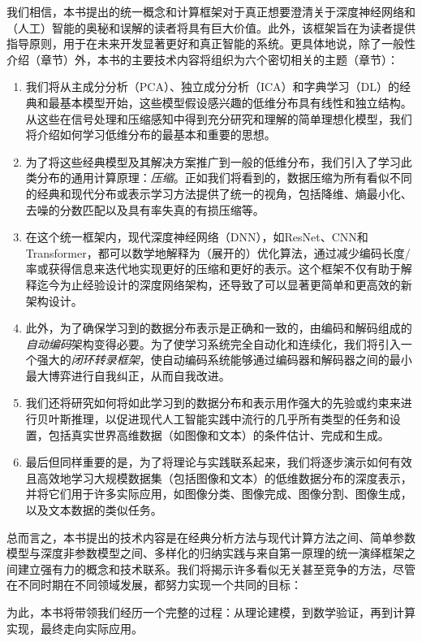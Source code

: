 \documentclass[../../book-main.tex]{subfiles}
\begin{document}
我们相信，本书提出的统一概念和计算框架对于真正想要澄清关于深度神经网络和（人工）智能的奥秘和误解的读者将具有巨大价值。此外，该框架旨在为读者提供指导原则，用于在未来开发显著更好和真正智能的系统。更具体地说，除了一般性介绍（章节）外，本书的主要技术内容将组织为六个密切相关的主题（章节）：
\begin{enumerate}
\item 我们将从主成分分析（PCA）、独立成分分析（ICA）和字典学习（DL）的经典和最基本模型开始，这些模型假设感兴趣的低维分布具有线性和独立结构。从这些在信号处理和压缩感知中得到充分研究和理解的简单理想化模型，我们将介绍如何学习低维分布的最基本和重要的思想。

\item 为了将这些经典模型及其解决方案推广到一般的低维分布，我们引入了学习此类分布的通用计算原理：{\em 压缩}。正如我们将看到的，数据压缩为所有看似不同的经典和现代分布或表示学习方法提供了统一的视角，包括降维、熵最小化、去噪的分数匹配以及具有率失真的有损压缩等。

\item 在这个统一框架内，现代深度神经网络（DNN），如ResNet、CNN和Transformer，都可以数学地解释为（展开的）优化算法，通过减少编码长度/率或获得信息来迭代地实现更好的压缩和更好的表示。这个框架不仅有助于解释迄今为止经验设计的深度网络架构，还导致了可以显著更简单和更高效的新架构设计。

\item 此外，为了确保学习到的数据分布表示是正确和一致的，由编码和解码组成的{\em 自动编码}架构变得必要。为了使学习系统完全自动化和连续化，我们将引入一个强大的{\em 闭环转录框架}，使自动编码系统能够通过编码器和解码器之间的最小最大博弈进行自我纠正，从而自我改进。

\item 我们还将研究如何将如此学习到的数据分布和表示用作强大的先验或约束来进行贝叶斯推理，以促进现代人工智能实践中流行的几乎所有类型的任务和设置，包括真实世界高维数据（如图像和文本）的条件估计、完成和生成。

\item 最后但同样重要的是，为了将理论与实践联系起来，我们将逐步演示如何有效且高效地学习大规模数据集（包括图像和文本）的低维数据分布的深度表示，并将它们用于许多实际应用，如图像分类、图像完成、图像分割、图像生成，以及文本数据的类似任务。
\end{enumerate}

总而言之，本书提出的技术内容是在经典分析方法与现代计算方法之间、简单参数模型与深度非参数模型之间、多样化的归纳实践与来自第一原理的统一演绎框架之间建立强有力的概念和技术联系。我们将揭示许多看似无关甚至竞争的方法，尽管在不同时期在不同领域发展，都努力实现一个共同的目标：
\begin{quote}
\end{quote}
为此，本书将带领我们经历一个完整的过程：从理论建模，到数学验证，再到计算实现，最终走向实际应用。
\end{document}
